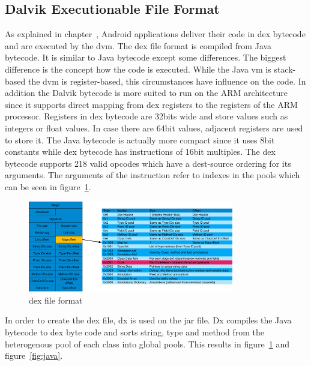 \subsection{Dalvik Executionable File Format} \label{subsection:android-dex}
As explained in chapter~\cite{subsection:foundation-android-package}, Android applications deliver their code in \gls{dex} bytecode and are executed by the \gls{dvm}.
The dex file format is compiled from Java bytecode. It is similar to Java bytecode except some differences.
The biggest difference is the concept how the code is executed.
While the Java \gls{vm} is stack-based the \gls{dvm} is register-based, this circumstances have influence on the code.
In addition the Dalvik bytecode is more suited to run on the ARM architecture since it supports direct mapping from dex registers to the registers of the ARM processor.
Registers in \gls{dex} bytecode are 32bits wide and store values such as integers or float values.
In case there are 64bit values, adjacent registers are used to store it.
The Java bytecode is actually more compact since it uses 8bit constants while \gls{dex} bytecode has instructions of 16bit multiples.
The \gls{dex} bytecode supports 218 valid opcodes which have a dest-source ordering for its arguments.
The arguments of the instruction refer to indexes in the pools which can be seen in figure~\ref{fig:dex}.
\newline
\begin{figure}[h]
    \centering
    \includegraphics[width=0.8\textwidth]{data/dex.png}
    \caption{\gls{dex} file format \cite{andevconDalvikART}}
    \label{fig:dex}
\end{figure}

In order to create the dex file, dx is used on the \gls{jar} file.
Dx compiles the Java bytecode to \gls{dex} byte code and sorts string, type and method from the heterogenous pool of each class into global pools.
This results in figure~\ref{fig:dex} and figure~\ref{fig:java}.

